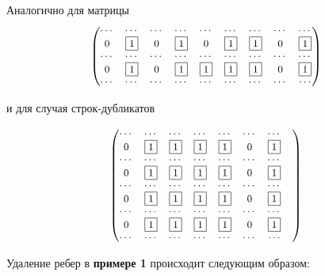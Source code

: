 \begin{figure}[h!]
	\noindent{}
\end{figure}

\clearpage
\noindent Аналогично для матрицы
\[
{\small
\begin{pmatrix}
    \cdots & \cdots & \cdots & \cdots & \cdots & \cdots & \cdots & \cdots & \cdots \cr
    0 & \fbox{1} & 0 & \fbox{1} & 0 & \fbox{1} & \fbox{1} & 0 & \fbox{1} \cr
    \cdots & \cdots & \cdots & \cdots & \cdots & \cdots & \cdots & \cdots & \cdots \cr
    0 & \fbox{1} & 0 & \fbox{1} & \fbox{1} & \fbox{1} & \fbox{1} & 0 & \fbox{1} \cr
    \cdots & \cdots & \cdots & \cdots & \cdots & \cdots & \cdots & \cdots & \cdots
\end{pmatrix}
}
\]

\begin{figure}[h!]
	\noindent{}
\end{figure}

\noindent и для случая строк-дубликатов

\[
{\small
\begin{pmatrix}
    \cdots & \cdots & \cdots & \cdots & \cdots & \cdots & \cdots & \cr
    0 & \fbox{1} & \fbox{1} & \fbox{1} & \fbox{1} & 0 & \fbox{1} \cr
    \cdots & \cdots & \cdots & \cdots & \cdots & \cdots & \cdots & \cr
    0 & \fbox{1} & \fbox{1} & \fbox{1} & \fbox{1} & 0 & \fbox{1} \cr
    \cdots & \cdots & \cdots & \cdots & \cdots & \cdots & \cdots & \cr
    0 & \fbox{1} & \fbox{1} & \fbox{1} & \fbox{1} & 0 & \fbox{1} \cr
    \cdots & \cdots & \cdots & \cdots & \cdots & \cdots & \cdots & \cr
    0 & \fbox{1} & \fbox{1} & \fbox{1} & \fbox{1} & 0 & \fbox{1} \cr
    \cdots & \cdots & \cdots & \cdots & \cdots & \cdots & \cdots
\end{pmatrix}
}
\]

\begin{figure}[h!]
	\noindent{}
\end{figure}

\clearpage
Удаление ребер в \textbf{примере 1} происходит следующим образом:

\begin{figure}[h!]
	\noindent{}
\end{figure}

